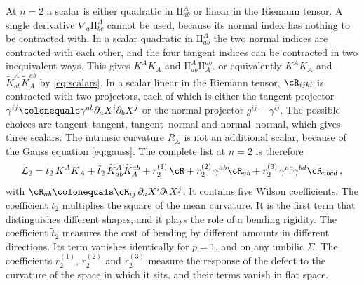 \documentclass[a4paper,11pt]{article}
\newcommand{\II}{\mathrm{I\!I}}
\newcommand{\Kt}{\widetilde{K}}
\begin{document}
At $n=2$ a scalar is either quadratic in $\II^A_{ab}$ or linear in the Riemann tensor. A single derivative $\nabla_a\II^A_{bc}$ cannot be used, because its normal index has nothing to be contracted with. In a scalar quadratic in $\II^A_{ab}$ the two normal indices are contracted with each other, and the four tangent indices can be contracted in two inequivalent ways. This gives $K^AK_A$ and $\II^A_{ab}\II_A^{ab}$, or equivalently $K^AK_A$ and $\Kt^A_{ab}\Kt_A^{ab}$ by \eqref{eq:scalars}. In a scalar linear in the Riemann tensor, $\cR_{ijkl}$ is contracted with two projectors, each of which is either the tangent projector $\gamma^{ij}\colonequals\gamma^{ab}\partial_aX^i\partial_bX^j$ or the normal projector $g^{ij}-\gamma^{ij}$. The possible choices are tangent--tangent, tangent--normal and normal--normal, which gives three scalars. The intrinsic curvature $R_\Sigma$ is not an additional scalar, because of the Gauss equation \eqref{eq:gauss}. The complete list at $n=2$ is therefore
\begin{equation}\label{eq:L2}
	\mathcal{L}_2=t_2\,K^AK_A+\tilde t_2\,\Kt^A_{ab}\Kt_A^{ab}
	+r_2^{(1)}\,\cR+r_2^{(2)}\,\gamma^{ab}\cR_{ab}+r_2^{(3)}\,\gamma^{ac}\gamma^{bd}\cR_{abcd} \, ,
\end{equation}
with $\cR_{ab}\colonequals\cR_{ij}\,\partial_aX^i\partial_bX^j$. It contains five Wilson coefficients. The coefficient $t_2$ multiplies the square of the mean curvature. It is the first term that distinguishes different shapes, and it plays the role of a bending rigidity. The coefficient $\tilde t_2$ measures the cost of bending by different amounts in different directions. Its term vanishes identically for $p=1$, and on any umbilic $\Sigma$. The coefficients $r_2^{(1)}$, $r_2^{(2)}$ and $r_2^{(3)}$ measure the response of the defect to the curvature of the space in which it sits, and their terms vanish in flat space.
\end{document}
